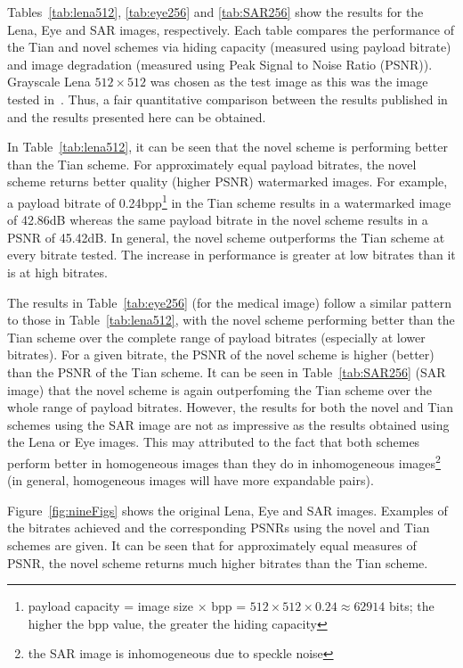 \documentclass[10pt,twocolumn,letterpaper]{article}
\begin{document}
{Tables~\ref{tab:lena512}, \ref{tab:eye256} and \ref{tab:SAR256} show the results for 
the Lena, Eye and SAR images, respectively. Each table compares the performance of the Tian and novel schemes
via hiding capacity (measured using payload bitrate) and image degradation
(measured using Peak Signal to Noise Ratio (PSNR)).
Grayscale Lena $512 \times 512$ was chosen as the test image as this was the image tested in~\cite{tian03}. Thus, a fair
quantitative comparison between the results published in~\cite{tian03} and the results presented here can be obtained.

In Table~\ref{tab:lena512}, it can be seen that the novel scheme is performing better than the Tian scheme. For 
approximately equal payload bitrates, the novel scheme returns better quality (higher PSNR) watermarked images.
For example, a payload bitrate of 
0.24bpp\footnote{payload capacity = image size $\times$ bpp = $512\times 512\times 0.24 \approx 62914$ bits; the higher 
the bpp value, the greater the hiding capacity} in the Tian
scheme results in a watermarked image of 42.86dB whereas the same payload bitrate in the novel scheme results in 
a PSNR of 45.42dB.
In general, the novel scheme outperforms the Tian scheme 
at every bitrate tested. The increase in performance is greater at low bitrates than it is at high bitrates.

The results in Table~\ref{tab:eye256} (for the medical image) follow a similar pattern to 
those in Table~\ref{tab:lena512}, with the novel scheme
performing better than the Tian scheme over the complete range of payload bitrates (especially at lower bitrates). 
For a given bitrate, the PSNR of the novel scheme is higher (better) than the PSNR of the Tian scheme.
It can be seen in Table~\ref{tab:SAR256} (SAR image) 
that the novel scheme is again outperfoming the Tian scheme over the whole range of payload bitrates. 
However, the results for both the novel and 
Tian schemes using the SAR image are not as impressive as the results obtained using the Lena or
Eye images. This may attributed to the fact that both schemes perform better in homogeneous
images than they do in inhomogeneous images\footnote{the SAR image is inhomogeneous due 
to speckle noise} (in general, homogeneous images will have more expandable pairs).

Figure~\ref{fig:nineFigs} shows the original Lena, Eye and SAR images. Examples of the bitrates
achieved and the corresponding PSNRs using the novel and Tian schemes are given. It can be seen that
for approximately equal measures of PSNR, the novel scheme returns much higher bitrates than the Tian 
scheme. 

}
\end{document}
